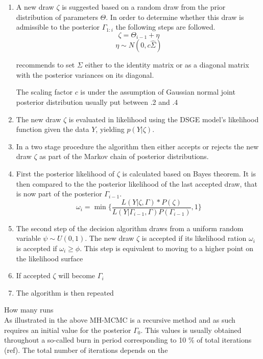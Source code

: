 \documentclass[11pt,a4paper,english]{article} %
\begin{document}
	\begin{enumerate}
		\item A new draw $\zeta$ is suggested based on a random draw from the prior distribution of parameters $\Theta$. In order to determine whether this draw is admissible to the posterior $\Gamma_{1:i}$ the following steps are followed.
		\[
			\zeta = \Theta_{i-1} + \eta
		\]
		\[
			\eta \sim N(0, c \hat{\Sigma})
		\]
		
		\cite{herbst_bayesian_2014} recommends to set $\Sigma$ either to the identity matrix or as a diagonal matrix with the posterior variances on its diagonal.
		
		The scaling factor $c$ is under the assumption of Gaussian normal joint posterior distribution usually put between .2 and .4
		
		\item The new draw $\zeta$ is evaluated in likelihood using the DSGE model's likelihood function given the data $Y$, yielding $p(Y | \zeta)$. 
				
		\item In a two stage procedure the algorithm then either accepts or rejects the new draw $\zeta$ as part of the Markov chain of posterior distributions. 
		
		\item First the posterior likelihood of $\zeta$ is calculated based on Bayes theorem. It is then compared to the the posterior likelihood of the last accepted draw, that is now part of the posterior $\Gamma_{i-1}$. 
		\[
			\omega_i = \min \{\frac{L(Y| \zeta, \Gamma) * P(\zeta)}{L(Y| \Gamma_{i-1}, \Gamma) P(\Gamma_{i-1})}, 1 \}
		\]

		\item The second step of the decision algorithm draws from a uniform random variable $\psi \sim U(0, 1)$. The new draw $\zeta$ is accepted if its likelihood ration $\omega_i$ is accepted if $\omega_i \geq \phi$. This step is equivalent to moving to a higher point on the likelihood surface \cite{herbst_bayesian_2014}
		
		\item If accepted $\zeta$ will become $\Gamma_i$
		
		\item The algorithm is then repeated
		
	\end{enumerate}

	How many runs\\
	

	As illustrated in the above MH-MCMC is a recursive method and as such requires an initial value for the posterior $\Gamma_0$. This values is usually obtained throughout a so-called burn in period corresponding to 10 \% of total iterations (ref). The total number of iterations depends on the 
	
\end{document}
